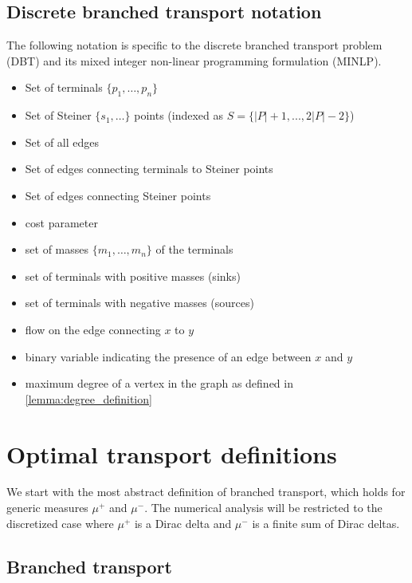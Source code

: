 \documentclass[11pt,reqno,a4paper]{amsart}
\newenvironment{itemizeb}
{\begin{itemize}
     \itemsep=2pt}{
\end{itemize}}
\numberwithin{equation}{section}
\theoremstyle{mytheorem}
\theoremstyle{myremark}
\theoremstyle{myparagraph}
\begin{document}
    \subsection{Discrete branched transport notation}
    The following notation is specific to the discrete branched transport problem (DBT) and its mixed integer non-linear programming formulation (MINLP).
    \begin{itemizeb}
         cm=.3 cm
        \item [$P$] Set of terminals $\{p_1, \ldots, p_n\}$
        \item [$S$] Set of Steiner $\{s_1, \ldots\}$ points (indexed as $S = \{|P| + 1, ..., 2|P|-2\}$)
        \item[$E$] Set of all edges
        \item [$E_1$] Set of edges connecting terminals to Steiner points
        \item [$E_2$] Set of edges connecting Steiner points

        \item[$\alpha \in {[0,1]}$] cost parameter
        \item [$M$] set of masses $\{m_1, \ldots, m_n\}$ of the terminals
        \item [$P^+$] set of terminals with positive masses (sinks)
        \item [$P^-$] set of terminals with negative masses (sources)
        \item [$f_{xy}$] flow on the edge connecting $x$ to $y$
        \item [$y_{xy}$] binary variable indicating the presence of an edge between $x$ and $y$
        \item [$deg(\alpha, N, M)$] maximum degree of a vertex in the graph as defined in \ref{lemma:degree_definition}
    \end{itemizeb}

    \newpage


    \section{Optimal transport definitions}

    We start with the most abstract definition of branched transport, which holds for generic measures $\mu^+$ and $\mu^-$.
    The numerical analysis will be restricted to the discretized case where $\mu^+$ is a Dirac delta and $\mu^-$ is a finite sum of Dirac deltas.

    \subsection{Branched transport \cite[Chapter 3]{Bernot}}
\end{document}
